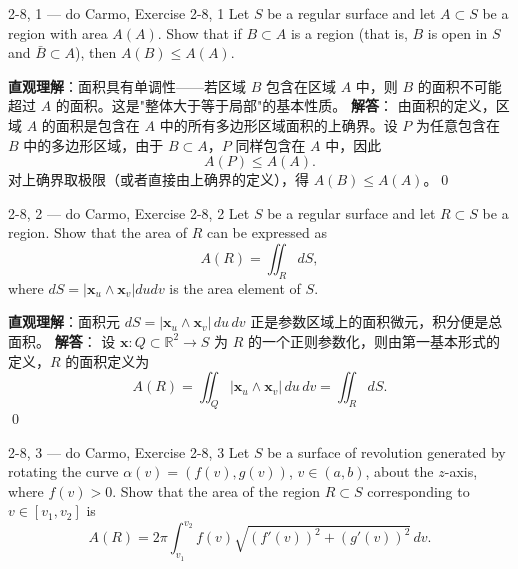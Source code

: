 \begin{exercise}
{2-8, 1 — do Carmo, Exercise 2-8, 1}
Let $S$ be a regular surface and let $A \subset S$ be a region with area $A(A)$. Show that if $B \subset A$ is a region (that is, $B$ is open in $S$ and $\bar{B} \subset A$), then $A(B) \leq A(A)$.


\end{exercise}

\begin{solution}
\textbf{直观理解}：面积具有单调性——若区域 $B$ 包含在区域 $A$ 中，则 $B$ 的面积不可能超过 $A$ 的面积。这是"整体大于等于局部"的基本性质。
\textbf{解答}：
由面积的定义，区域 $A$ 的面积是包含在 $A$ 中的所有多边形区域面积的上确界。设 $P$ 为任意包含在 $B$ 中的多边形区域，由于 $B \subset A$，$P$ 同样包含在 $A$ 中，因此
\[
A(P) \leq A(A).
\]
对上确界取极限（或者直接由上确界的定义），得 $A(B) \leq A(A)$。\qed
\end{solution}
\begin{exercise}
{2-8, 2 — do Carmo, Exercise 2-8, 2}
Let $S$ be a regular surface and let $R \subset S$ be a region. Show that the area of $R$ can be expressed as
\[
A(R) = \iint_R dS,
\]
where $dS = |\mathbf{x}_u \wedge \mathbf{x}_v| du dv$ is the area element of $S$.


\end{exercise}

\begin{solution}
\textbf{直观理解}：面积元 $dS = |\mathbf{x}_u \wedge \mathbf{x}_v| \, du \, dv$ 正是参数区域上的面积微元，积分便是总面积。
\textbf{解答}：
设 $\mathbf{x}: Q \subset \mathbb{R}^2 \to S$ 为 $R$ 的一个正则参数化，则由第一基本形式的定义，$R$ 的面积定义为
\[
A(R) = \iint_Q |\mathbf{x}_u \wedge \mathbf{x}_v| \, du \, dv = \iint_R dS.
\]
\qed
\end{solution}
\begin{exercise}
{2-8, 3 — do Carmo, Exercise 2-8, 3}
Let $S$ be a surface of revolution generated by rotating the curve $\alpha(v) = (f(v), g(v))$, $v \in (a, b)$, about the $z$-axis, where $f(v) > 0$. Show that the area of the region $R \subset S$ corresponding to $v \in [v_1, v_2]$ is
\[
A(R) = 2\pi \int_{v_1}^{v_2} f(v) \sqrt{(f'(v))^2 + (g'(v))^2} \, dv.
\]


\end{exercise}

